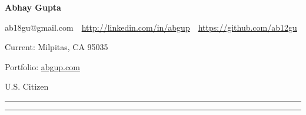 \documentclass[letterpaper,10pt,oneside]{article}
\newcommand{\CVWebpage}{http://linkedin.com/in/abgup}
\newcommand{\CVWeb}{abgup.com}
\newcommand{\CVWebg}{http://abgup.com}
\newcommand{\github}{https://github.com/ab12gu}
\begin{document}

{
\fontsize{35}{60}
\textbf{       Abhay Gupta}
}

\begin{subtitle}
\vspace{-11ex}
{{ab18gu@gmail.com}}
\,\SubBulletSymbol\,
\href{\CVWebpage}
{\CVWebpage}
\,\SubBulletSymbol\,
\href{\github}
{\github}
\par{Current: \color{cblue} Milpitas, CA 95035}
\par{Portfolio: \color{red} \href{\CVWebg}{\CVWeb}{}}
\par{U.S. Citizen}

\end{subtitle}

\vspace{-3ex}
{\hspace{0.07in}\noindent\color{dblue}\rule{7.1in}{0.4pt}}

\vspace{-3ex}
{\hspace{0.07in}\noindent\color{dblue}\rule{7.1in}{0.4pt}}
\end{document}
